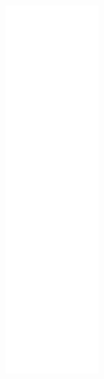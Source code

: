 \begin{figure}[H]
\begin{center}
\leavevmode
\includegraphics[height=400pt]{classAutoHoldStateHandler__coll__graph}
\end{center}
\end{figure}
